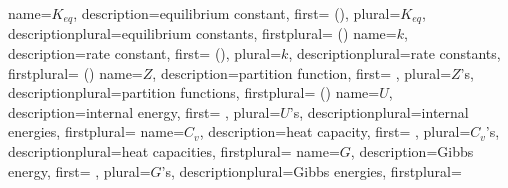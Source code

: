 {
  name={$K_{eq}$},
  description={equilibrium constant},
  first={ ()},
  plural={$K_{eq}$},
  descriptionplural={equilibrium constants},
  firstplural={ ()}
}
{
  name={$k$},
  description={rate constant},
  first={ ()},
  plural={$k$},
  descriptionplural={rate constants},
  firstplural={ ()}
}
{
  name={$Z$},
  description={partition function},
  first={ },
  plural={$Z$'s},
  descriptionplural={partition functions},
  firstplural={ ()}
}
{
  name={$U$},
  description={internal energy},
  first={ },
  plural={$U$'s},
  descriptionplural={internal energies},
  firstplural={ }
}
{
  name={$C_{v}$},
  description={heat capacity},
  first={ },
  plural={$C_{v}$'s},
  descriptionplural={heat capacities},
  firstplural={ }
}
{
  name={$G$},
  description={Gibbs energy},
  first={ },
  plural={$G$'s},
  descriptionplural={Gibbs energies},
  firstplural={ }
}
